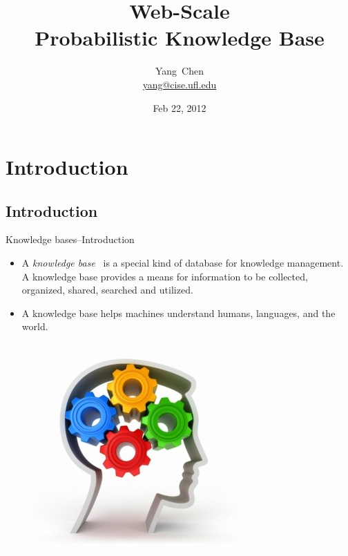 \documentclass[onlymath,xcolor=pdftex,dvipsnames,table]{beamer}
\title[\probkb Web-Scale Probabilistic Knowledge Base]%
{\probkb Web-Scale\\Probabilistic Knowledge Base}
\author %
{Yang~Chen\\{\footnotesize\url{yang@cise.ufl.edu}}}
\institute[University of Florida] %
{
  Computer and Information Science and Engineering\\
  University of Florida\\
}
\date{Feb 22, 2012} %
\let\oldemph\emph
\renewcommand{\emph}[1]{{\color{Blue}\oldemph{#1}}}
\begin{document}
\maketitle

\section{Introduction}
\subsection{Introduction}
\begin{frame}{Knowledge bases--Introduction}
\begin{itemize}
  \item A \emph{knowledge base}~\cite{nath2010efficient} is a special kind of database for knowledge management.
A knowledge base provides a means for information to be collected, organized,
shared, searched and utilized.
  \item A knowledge base helps machines understand humans, languages, and the world.
\end{itemize}
\begin{figure}
  \centering
  \includegraphics[width=.3\textwidth]{knowledgeBase.jpg}
\end{figure}
\end{frame}


\end{document}
